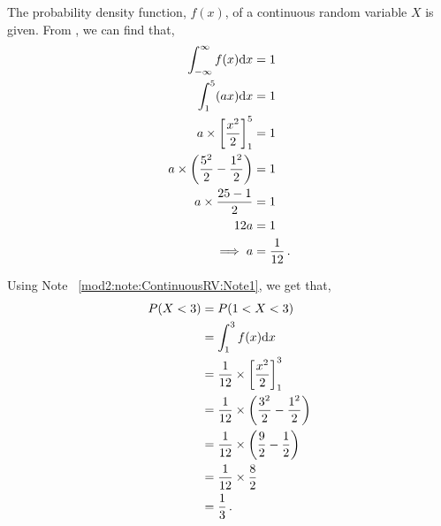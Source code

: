 %
%


\begin{subquestions}
	
\subquestion

The probability density function, $f(x)$, of a continuous random variable $X$ is given.
From , we can find that,
\begin{align}
	\int_{-\infty}^{\infty} f(x)\mathrm{d}x  & = 1 \nonumber \\
	\int_{1}^{5} (ax)\mathrm{d}x  & = 1 \nonumber \\
	a \times \left[\frac{x^2}{2}\right]^5_1 & = 1 \nonumber \\
	a \times \left(\frac{5^2}{2}- \frac{1^2}{2}\right) & = 1 \nonumber \\
	a \times \frac{25-1}{2} & = 1 \nonumber \\
	12a & = 1 \nonumber \\
	\implies a & = \frac{1}{12} \,.
\end{align}
	

\subquestion

Using Note ~\ref{mod2:note:ContinuousRV:Note1}, we get that,
\begin{align}
	P(X<3) & = P(1<X<3) \nonumber \\
	       & = \int_{1}^{3} f(x)\mathrm{d}x \nonumber \\
	       & = \frac{1}{12} \times \left[\frac{x^2}{2}\right]^3_1 \nonumber \\
	       & = \frac{1}{12} \times \left(\frac{3^2}{2} - \frac{1^2}{2}\right) \nonumber \\
	       & = \frac{1}{12} \times \left(\frac{9}{2} - \frac{1}{2}\right) \nonumber \\
	       & = \frac{1}{12} \times \frac{8}{2} \nonumber \\
	       & = \frac{1}{3} \,. 
\end{align}
	

\end{subquestions}
